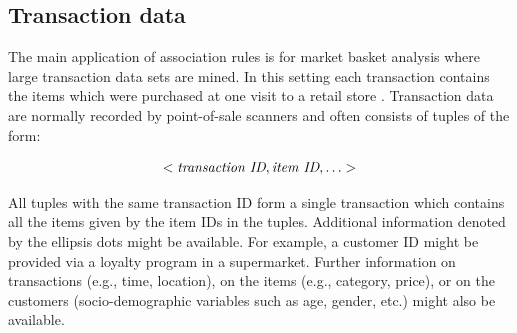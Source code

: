 \documentclass[10pt,a4paper]{article}
\begin{document}

\subsection{Transaction data\label{sec:transactions}}

The main application of association rules is for market basket analysis
where large transaction data sets are mined.  In this setting each
transaction contains the items which were purchased at one visit to a
retail store \citep[see e.g.,][]{arules:Berry+Linoff:1997}.
Transaction data are normally recorded by point-of-sale
scanners and often consists of tuples of the form:

\begin{displaymath}
<\emph{transaction ID}, \emph{item ID}, \ldots >
\end{displaymath}

All tuples with the same transaction ID form a single transaction which
contains all the items given by the item IDs in the tuples.  Additional
information denoted by the ellipsis dots might be available.  For
example, a customer ID might be provided via a loyalty program in a
supermarket.  Further information on transactions (e.g., time,
location), on the items (e.g., category, price), or on the customers
(socio-demographic variables such as age, gender, etc.) might also be
available.
\end{document}
